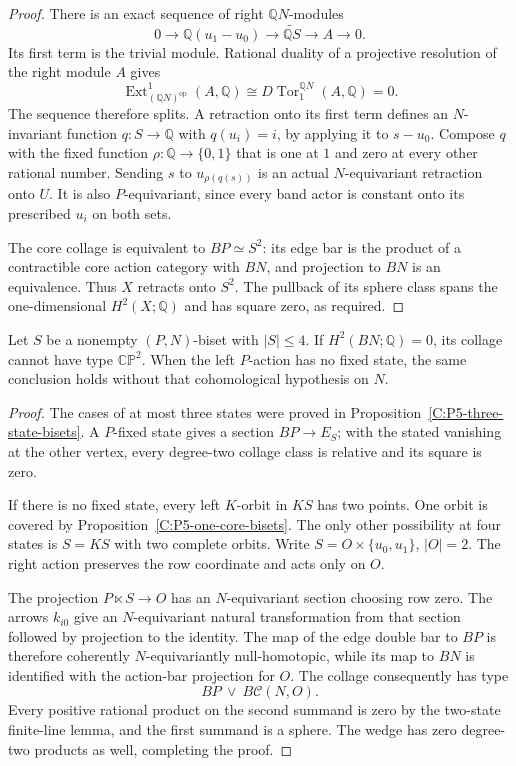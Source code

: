 \begin{proof}
There is an exact sequence of right $\mathbb QN$-modules
\[
 0\longrightarrow\mathbb Q(u_1-u_0)
 \longrightarrow\widetilde{\mathbb QS}
 \longrightarrow A\longrightarrow0.
\]
Its first term is the trivial module.  Rational duality
of a projective resolution of the right module $A$ gives
\[
 \operatorname{Ext}^1_{(\mathbb QN)^{\mathrm{op}}}(A,\mathbb Q)
   \cong D\operatorname{Tor}^{\mathbb QN}_1(A,\mathbb Q)=0.
\]
The sequence therefore splits.  A retraction onto its first
term defines an $N$-invariant function $q:S\to\mathbb Q$
with $q(u_i)=i$, by applying it to $s-u_0$.
Compose $q$ with the fixed function
$\rho:\mathbb Q\to\{0,1\}$ that is one at $1$ and zero
at every other rational number.  Sending $s$ to
$u_{\rho(q(s))}$ is an actual $N$-equivariant retraction
onto $U$.  It is also $P$-equivariant, since every band
actor is constant onto its prescribed $u_i$ on both sets.

The core collage is equivalent to $BP\simeq S^2$: its edge
bar is the product of a contractible core action category
with $BN$, and projection to $BN$ is an equivalence.
Thus $X$ retracts onto $S^2$.  The pullback of its sphere
class spans the one-dimensional $H^2(X;\mathbb Q)$ and
has square zero, as required.
\end{proof}

\begin{proposition}
\label{C:P5-four-state-bisets}
Let $S$ be a nonempty $(P,N)$-biset with $|S|\leq4$.
If $H^2(BN;\mathbb Q)=0$, its collage cannot have type
$\mathbb{CP}^2$.  When the left $P$-action has no fixed
state, the same conclusion holds without that cohomological
hypothesis on $N$.
\end{proposition}
\begin{proof}
The cases of at most three states were proved in
Proposition~\ref{C:P5-three-state-bisets}.  A $P$-fixed
state gives a section $BP\to E_S$; with the stated
vanishing at the other vertex, every degree-two collage
class is relative and its square is zero.

If there is no fixed state, every left $K$-orbit in $KS$
has two points.  One orbit is covered by
Proposition~\ref{C:P5-one-core-bisets}.  The only other
possibility at four states is $S=KS$ with two complete
orbits.  Write $S=O\times\{u_0,u_1\}$, $|O|=2$.
The right action preserves the row coordinate and acts
only on $O$.

The projection $P\ltimes S\to O$ has an $N$-equivariant
section choosing row zero.  The arrows $k_{i0}$ give an
$N$-equivariant natural transformation from that section
followed by projection to the identity.  The map of the
edge double bar to $BP$ is therefore coherently
$N$-equivariantly null-homotopic, while its map to $BN$
is identified with the action-bar projection for $O$.
The collage consequently has type
\[
 BP\ \vee\ B\mathcal C(N,O).
\]
Every positive rational product on the second summand is
zero by the two-state finite-line lemma, and the first
summand is a sphere.  The wedge has zero degree-two
products as well, completing the proof.
\end{proof}

